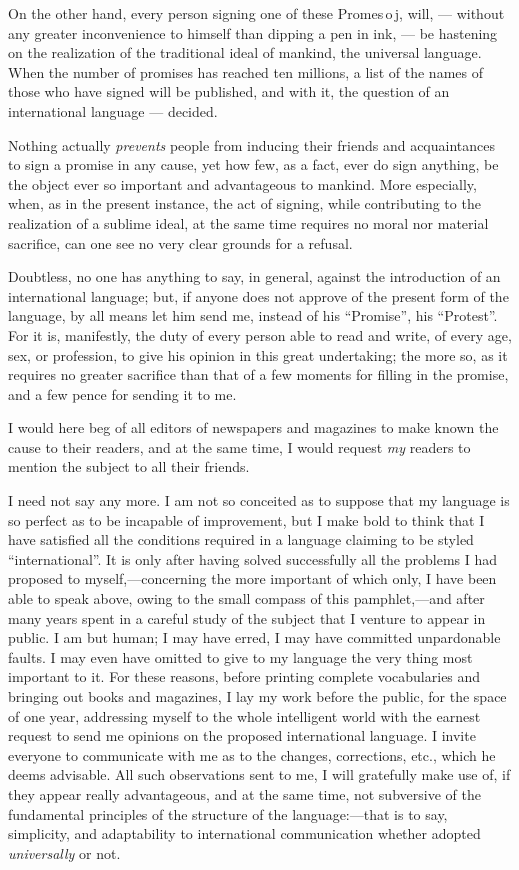 \documentclass[12pt,twoside]{book}
\begin{document}
On the other hand, every person signing one of these \glqq{}Promes\,o\,j\grqq{}, will, --- without any greater inconvenience to himself than dipping a pen in ink, --- be hastening on the realization of the traditional ideal of mankind, the universal language. When the number of promises has reached ten millions, a list of the names of those who have signed will be published, and with it, the question of an international language --- decided.

Nothing actually \emph{prevents} people from inducing their friends and acquaintances to sign a promise in any cause, yet how few, as a fact, ever do sign anything, be the object ever so important and advantageous to mankind. More especially, when, as in the present instance, the act of signing, while contributing to the realization of a sublime ideal, at the same time requires no moral nor material sacrifice, can one see no very clear grounds for a refusal.

Doubtless, no one has anything to say, in general, against the introduction of an international language; but, if anyone does not approve of the present form of the language, by all means let him send me, instead of his “Promise”, his “Protest”. For it is, manifestly, the duty of every person able to read and write, of every age, sex, or profession, to give his opinion in this great undertaking; the more so, as it requires no greater sacrifice than that of a few moments for filling in the promise, and a few pence for sending it to me.

I would here beg of all editors of newspapers and magazines to make known the cause to their readers, and at the same time, I would request \emph{my} readers to mention the subject to all their friends.

I need not say any more. I am not so conceited as to suppose that my language is so perfect as to be incapable of improvement, but I make bold to think that I have satisfied all the conditions required in a language claiming to be styled “international”. It is only after having solved successfully all the problems I had proposed to myself,---concerning the more important of which only, I have been able to speak above, owing to the small compass of this pamphlet,---and after many years spent in a careful study of the subject that I venture to appear in public. I am but human; I may have erred, I may have committed unpardonable faults. I may even have omitted to give to my language the very thing most important to it. For these reasons, before printing complete vocabularies and bringing out books and magazines, I lay my work before the public, for the space of one year, addressing myself to the whole intelligent world with the earnest request to send me opinions on the proposed international language. I invite everyone to communicate with me as to the changes, corrections, etc., which he deems advisable. All such observations sent to me, I will gratefully make use of, if they appear really advantageous, and at the same time, not subversive of the fundamental principles of the structure of the language:---that is to say, simplicity, and adaptability to international communication whether adopted \emph{universally} or not.
\end{document}
